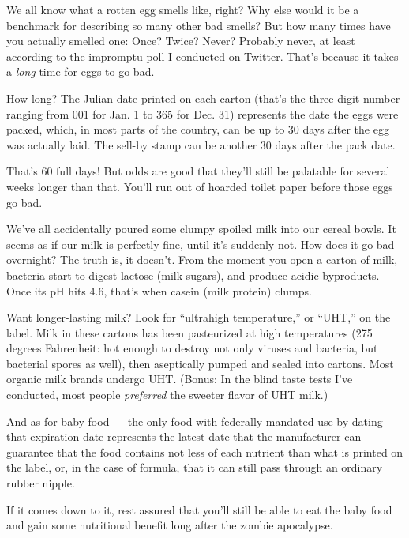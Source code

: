 We all know what a rotten egg smells like, right? Why else would it be a
benchmark for describing so many other bad smells? But how many times
have you actually smelled one: Once? Twice? Never? Probably never, at
least according to
\href{https://twitter.com/kenjilopezalt/status/1244897822668816385?s=20}{the
impromptu poll I conducted on Twitter}. That's because it takes a
\emph{long} time for eggs to go bad.

How long? The Julian date printed on each carton (that's the three-digit
number ranging from 001 for Jan. 1 to 365 for Dec. 31) represents the
date the eggs were packed, which, in most parts of the country, can be
up to 30 days after the egg was actually laid. The sell-by stamp can be
another 30 days after the pack date.

That's 60 full days! But odds are good that they'll still be palatable
for several weeks longer than that. You'll run out of hoarded toilet
paper before those eggs go bad.

We've all accidentally poured some clumpy spoiled milk into our cereal
bowls. It seems as if our milk is perfectly fine, until it's suddenly
not. How does it go bad overnight? The truth is, it doesn't. From the
moment you open a carton of milk, bacteria start to digest lactose (milk
sugars), and produce acidic byproducts. Once its pH hits 4.6, that's
when casein (milk protein) clumps.

Want longer-lasting milk? Look for ``ultrahigh temperature,'' or
``UHT,'' on the label. Milk in these cartons has been pasteurized at
high temperatures (275 degrees Fahrenheit: hot enough to destroy not
only viruses and bacteria, but bacterial spores as well), then
aseptically pumped and sealed into cartons. Most organic milk brands
undergo UHT. (Bonus: In the blind taste tests I've conducted, most
people \emph{preferred} the sweeter flavor of UHT milk.)

And as for
\href{https://cooking.nytimes3xbfgragh.onion/guides/57-how-to-make-baby-food}{baby
food} --- the only food with federally mandated use-by dating --- that
expiration date represents the latest date that the manufacturer can
guarantee that the food contains not less of each nutrient than what is
printed on the label, or, in the case of formula, that it can still pass
through an ordinary rubber nipple.

If it comes down to it, rest assured that you'll still be able to eat
the baby food and gain some nutritional benefit long after the zombie
apocalypse.

